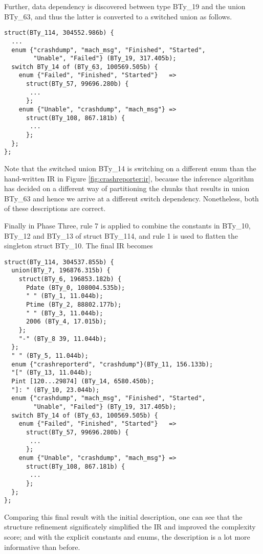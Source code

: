 Further, data dependency is discovered between type BTy\_19
and the union BTy\_63, and thus the latter is converted to
a switched union as follows.

{\small
\begin{verbatim}
struct(BTy_114, 304552.986b) {
  ...
  enum {"crashdump", "mach_msg", "Finished", "Started", 
        "Unable", "Failed"} (BTy_19, 317.405b);
  switch BTy_14 of (BTy_63, 100569.505b) {
    enum {"Failed", "Finished", "Started"}   => 
      struct(BTy_57, 99696.280b) {
       ...
      };
    enum {"Unable", "crashdump", "mach_msg"} =>
      struct(BTy_108, 867.181b) {
       ...
      };
  };
};
\end{verbatim}
}

Note that the switched union BTy\_14 is switching on a different enum 
than the hand-written IR in Figure \ref{fig:crashreporter:ir}, because
the inference algorithm has decided on a different way of partitioning
the chunks that results in union BTy\_63 and hence we arrive at a 
different switch dependency. Nonetheless, both of these descriptions are
correct. 

Finally in Phase Three, rule 7 is applied to combine the constants in BTy\_10,
BTy\_12 and BTy\_13 of struct BTy\_114, and rule 1 is used to flatten
the singleton struct BTy\_10. The final IR becomes

{\small
\begin{verbatim}
struct(BTy_114, 304537.855b) {
  union(BTy_7, 196876.315b) {
    struct(BTy_6, 196853.182b) {
      Pdate (BTy_0, 108004.535b);
      " " (BTy_1, 11.044b);
      Ptime (BTy_2, 88802.177b);
      " " (BTy_3, 11.044b);
      2006 (BTy_4, 17.015b);
    };
    "-" (BTy_8 39, 11.044b);
  };
  " " (BTy_5, 11.044b);
  enum {"crashreporterd", "crashdump"}(BTy_11, 156.133b);
  "[" (BTy_13, 11.044b);
  Pint [120...29874] (BTy_14, 6580.450b);
  "]: " (BTy_10, 23.044b);
  enum {"crashdump", "mach_msg", "Finished", "Started", 
        "Unable", "Failed"} (BTy_19, 317.405b);
  switch BTy_14 of (BTy_63, 100569.505b) {
    enum {"Failed", "Finished", "Started"}   => 
      struct(BTy_57, 99696.280b) {
       ...
      };
    enum {"Unable", "crashdump", "mach_msg"} =>
      struct(BTy_108, 867.181b) {
       ...
      };
  };
};
\end{verbatim}
}

Comparing this final result with the initial description, one can see that
the structure refinement significately simplified the IR and improved the
complexity score; and with
the explicit constants and enums, the description is a lot more
informative than before.
